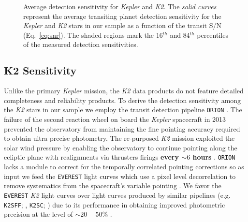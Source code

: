 \documentclass[twocolumn]{emulateapj}
\newcommand{\kepler}[1]{\emph{Kepler}#1}
\newcommand{\ktwo}[1]{\emph{K2}#1}
\newcommand{\tess}[1]{\emph{TESS}#1}
\begin{document}
\begin{figure}
  \centering
  \caption{Average detection sensitivity for \kepler{} and \ktwo{.} The \emph{solid curves} represent the
    average transiting planet detection sensitivity for the \kepler{} and \ktwo{} stars in our sample as
    a function of the transit S/N (Eq.~\ref{eq:snr}). The shaded regions mark the 16$^{th}$ and 84$^{th}$
    percentiles of the measured detection sensitivities.} 
  \label{fig:senscurves}
\end{figure}


\subsection{K2 Sensitivity}
Unlike the primary \kepler{} mission, the \ktwo{} data products do not feature detailed completeness and reliability
products. To derive the detection sensitivity among the \ktwo{} stars in our sample we employ the transit detection
pipeline \texttt{ORION} \citep{cloutier19b}.
The failure of the second reaction wheel on board the \kepler{} spacecraft in 2013 prevented the observatory from
maintaining the fine pointing accuracy required to obtain ultra precise photometry. The re-purposed \ktwo{}
mission exploited the solar wind pressure by enabling the observatory to continue pointing along the ecliptic
plane with realignments via thrusters firings \textbf{every $\sim 6$ hours} \citep{howell14}.
\texttt{ORION} lacks a module to correct for the temporally correlated pointing corrections so as input we feed
the \texttt{EVEREST} light curves which use a pixel level decorrelation to remove systematics from the spacecraft's
variable pointing \citep{luger16,luger18}. We favor the \texttt{EVEREST} \ktwo{} light curves over light curves
produced by similar pipelines (e.g. \texttt{K2SFF}; \citealt{vanderburg14}, \texttt{K2SC};
\citealt{aigrain15,aigrain16})
due to its performance in obtaining improved photometric precision at the level of $\sim 20-50$\% \citep{luger16}.
\end{document}
